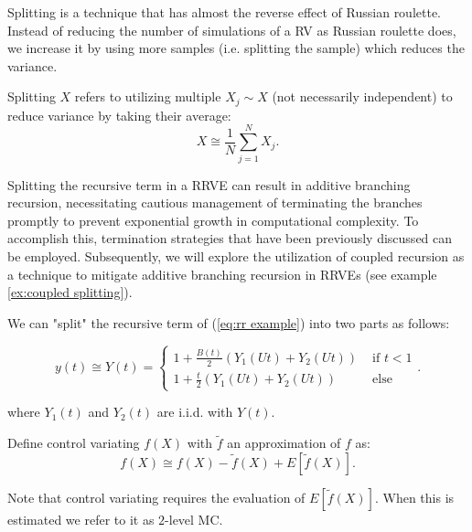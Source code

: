 \documentclass[a4paper,12pt]{article}
\begin{document}
Splitting is a technique that has almost the reverse effect of Russian roulette.
Instead of reducing the number of simulations of a RV as Russian roulette does,
we increase it by using more samples (i.e. splitting the sample) which
reduces the variance.

\begin{definition}[splitting] \label{def:splitting}
    Splitting $X$ refers to utilizing multiple $X_{j} \sim X$ (not necessarily independent) to
    reduce variance by taking their average:
    \begin{equation}
        X \cong \frac{1}{N} \sum_{j=1}^{N} X_{j}.
    \end{equation}
\end{definition}

Splitting the recursive term in a RRVE can result in additive branching recursion,
necessitating cautious management of terminating the branches promptly to prevent
exponential growth in computational complexity. To accomplish this, termination
strategies that have been previously discussed can be employed. Subsequently,
we will explore the utilization of coupled recursion as a technique to mitigate
additive branching recursion in RRVEs (see example \ref{ex:coupled splitting}).

\begin{example} \label{ex:splitting}
    We can "split" the recursive term of (\ref{eq:rr example})
    into two parts as follows:

    \begin{equation}\label{eq:splitting}
        y(t) \cong Y(t) =
        \begin{cases}
            1 + \frac{B(t)}{2}(Y_{1}(Ut) + Y_{2}(Ut)) & \text{ if } t < 1 \\
            1 + \frac{t}{2}(Y_{1}(Ut) + Y_{2}(Ut))    & \text{ else}
        \end{cases}.
    \end{equation}

    where $Y_{1}(t)$ and $Y_{2}(t)$ are i.i.d. with $Y(t)$.
\end{example}

\vspace{0.2cm}

\begin{pythonn}
\end{pythonn}

\begin{definition} \label{CV}
    Define control variating $f(X)$ with $\tilde{f}$ an approximation of $f$ as:
    \begin{equation}
        f(X) \cong f(X)-\tilde{f}(X) + E[\tilde{f}(X)].
    \end{equation}

    Note that control variating requires the evaluation of
    $E[\tilde{f}(X)]$. When this is estimated we refer to it as $2$-level MC.
\end{definition}
\end{document}
